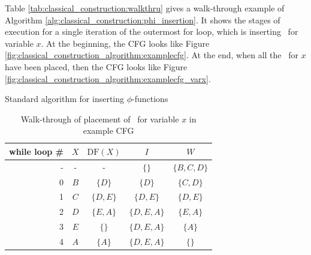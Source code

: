 Table \ref{tab:classical_construction:walkthru} 
gives a walk-through example of Algorithm 
\ref{alg:classical_construction:phi_insertion}.
It shows the stages of execution for a single iteration of
the outermost for loop, which is inserting \phiops\
for variable $x$.
At the beginning, the CFG looks like Figure \ref{fig:classical_construction_algorithm:examplecfg}.
At the end, when all the \phiops\ for $x$ have
been placed, then the CFG looks like Figure \ref{fig:classical_construction_algorithm:examplecfg_varx}.

\begin{algorithm}
\caption{\label{alg:classical_construction:phi_insertion}Standard algorithm for inserting $\phi$-functions}
\end{algorithm}


\begin{table}
\begin{center}
\begin{tabular}{r|c|c|c|c}
\textbf{while loop \#} & $X$ & $\textrm{DF}(X)$ & $I$         & $W$\\ \hline
-                      & -   & -                & $\{\}$      & $\{B,C,D\}$ \\
0                      & $B$ & $\{D\}$          & $\{D\}$     & $\{C,D\}$ \\
1                      & $C$ & $\{D,E\}$        & $\{D,E\}$   & $\{D,E\}$ \\
2                      & $D$ & $\{E,A\}$        & $\{D,E,A\}$ & $\{E,A\}$\\
3                      & $E$ & $\{\}$           & $\{D,E,A\}$ & $\{A\}$\\
4                      & $A$ & $\{A\}$          & $\{D,E,A\}$ & $\{\}$\\ \hline
\end{tabular}
\end{center}
\caption{\label{table:classical_construction:walkthru}Walk-through of
  placement of \phiops\ for variable $x$ in example CFG}
\end{table}

